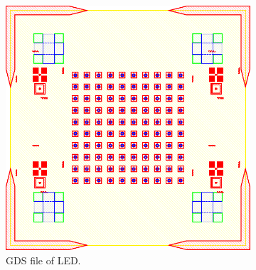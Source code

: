 \begin{figure}
\begin{subfigure}[t]{0.3\textwidth}
        \includegraphics[width=\textwidth]{Main/Ch4/ONOFF_NC_2022_V3.GDS_LED.pdf}
        \caption{GDS file of LED.}
        \label{fig:P3_GDS_LED}
    \end{subfigure}
    ~
    \begin{subfigure}[t]{0.3\textwidth}

\end{subfigure}
\end{figure}
